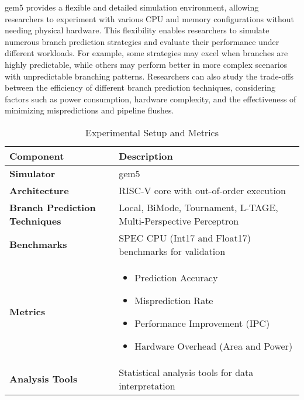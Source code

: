 \documentclass[10pt,journal,compsoc]{IEEEtran}
\begin{document}
gem5 provides a flexible and detailed simulation environment, allowing researchers to experiment with various CPU and memory configurations without needing physical hardware. This flexibility enables researchers to simulate numerous branch prediction strategies and evaluate their performance under different workloads. For example, some strategies may excel when branches are highly predictable, while others may perform better in more complex scenarios with unpredictable branching patterns. Researchers can also study the trade-offs between the efficiency of different branch prediction techniques, considering factors such as power consumption, hardware complexity, and the effectiveness of minimizing mispredictions and pipeline flushes.
\begin{table}[h]
    \centering
    \caption{Experimental Setup and Metrics}
    \begin{tabular}{| >{\centering\arraybackslash}m{2cm}| >{\centering\arraybackslash}m{4cm}|}
        \hline
        \textbf{Component} & \textbf{Description} \\
        \hline
        \textbf{Simulator} & gem5 \\
        \hline
        \textbf{Architecture} & RISC-V core with out-of-order execution \\
        \hline
        \textbf{Branch Prediction Techniques} & Local, BiMode, Tournament, L-TAGE, Multi-Perspective Perceptron \\
        \hline
        \textbf{Benchmarks} & SPEC CPU (Int17 and Float17) benchmarks for validation \\
        \hline
        \textbf{Metrics} & \begin{itemize}
            \item Prediction Accuracy
            \item Misprediction Rate
            \item Performance Improvement (IPC)
            \item \raggedright{}Hardware Overhead (Area and Power)
        \end{itemize} \\
        \hline
        \textbf{Analysis Tools} & Statistical analysis tools for data interpretation \\
        \hline
    \end{tabular}
\end{table}
\end{document}

